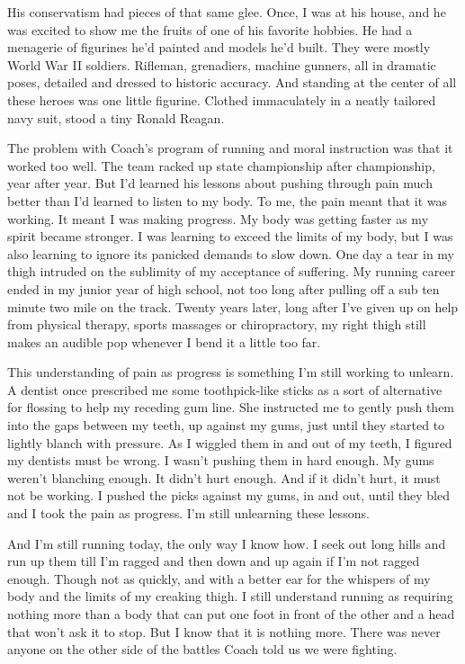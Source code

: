 \documentclass[12pt, oneside]{memoir}
\begin{document}
His conservatism had pieces of that same glee.
Once, I was at his house, and he was excited to show me the fruits of
one of his favorite hobbies.
He had a menagerie of figurines he'd painted and models he'd built.
They were mostly World War II soldiers.
Rifleman, grenadiers, machine gunners, all in dramatic poses, detailed
and dressed to historic accuracy.
And standing at the center of all these heroes was one little figurine.
Clothed immaculately in a neatly tailored navy suit, stood a tiny
Ronald Reagan. 

The problem with Coach's program of running and moral instruction was
that it worked too well.
The team racked up state championship after championship, year after
year.
But I'd learned his lessons about pushing through pain much better
than I'd learned to listen to my body.
To me, the pain meant that it was working.
It meant I was making progress.
My body was getting faster as my spirit became stronger.
I was learning to exceed the limits of my body, but I was also
learning to ignore its panicked demands to slow down.
One day a tear in my thigh intruded on the sublimity of my acceptance
of suffering.
My running career ended in my junior year of high school, not too long
after pulling off a sub ten minute two mile on the track.
Twenty years later, long after I've given up on help from physical
therapy, sports massages or chiropractory, my right thigh still makes
an audible pop whenever I bend it a little too far.

This understanding of pain as progress is something I'm still working
to unlearn.
A dentist once prescribed me some toothpick-like sticks as a sort of
alternative for flossing to help my receding gum line.
She instructed me to gently push them into the gaps between my teeth,
up against my gums, just until they started to lightly blanch with
pressure.
As I wiggled them in and out of my teeth, I figured my dentists must
be wrong.
I wasn't pushing them in hard enough.
My gums weren't blanching enough.
It didn't hurt enough.
And if it didn't hurt, it must not be working.
I pushed the picks against my gums, in and out, until they bled and I
took the pain as progress.
I'm still unlearning these lessons.

And I'm still running today, the only way I know how.
I seek out long hills and run up them till I'm ragged and then
down and up again if I'm not ragged enough.
Though not as quickly, and with a better ear for the whispers of my
body and the limits of my creaking thigh.
I still understand running as requiring nothing more than a body that
can put one foot in front of the other and a head that won’t ask it to
stop.
But I know that it is nothing more.
There was never anyone on the other side of the battles Coach
told us we were fighting.
\end{document}
